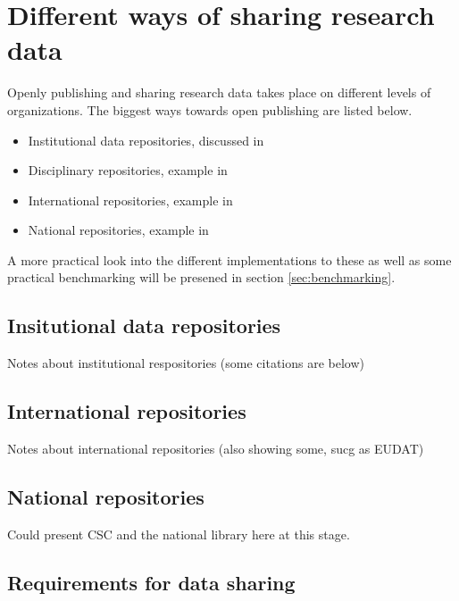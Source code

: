 \section{Different ways of sharing research data}

Openly publishing and sharing research data takes place on different levels of
organizations. The biggest ways towards open publishing are listed below.

\begin{itemize}
    \item Institutional data repositories, discussed in \cite{cragin2010data}
    \item Disciplinary repositories, example in \cite{DBLP:journals/nar/EdgarDL03}
    \item International repositories, example in \cite{2013EGUGA..15.7202L}
    \item National repositories, example in \cite{cimino2010clinical}
\end{itemize}

A more practical look into the different implementations to these as well as
some practical benchmarking will be presened in section \ref{sec:benchmarking}.

\iffalse

\subsection{Insitutional data repositories}

Notes about institutional respositories (some citations are below)

\subsection{International repositories}

Notes about international repositories (also showing some, sucg as EUDAT)

\subsection{National repositories}

Could present CSC and the national library here at this stage.

\subsection{Requirements for data sharing}


